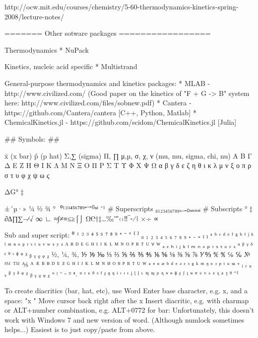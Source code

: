 http://ocw.mit.edu/courses/chemistry/5-60-thermodynamics-kinetics-spring-2008/lecture-notes/




======= Other sotware packages =================


Thermodynamics
* NuPack


Kinetics, nucleic acid specific
* Multistrand

General-purpose thermodynamics and kinetics packages:
* MLAB - http://www.civilized.com/ (Good paper on the kinetics of "F + G -> B" system here: http://www.civilized.com/files/sobnew.pdf)
* Cantera - https://github.com/Cantera/cantera   [C++, Python, Matlab]
* ChemicalKinetics.jl - https://github.com/scidom/ChemicalKinetics.jl  [Julia]



## Symbols: ##

    x̄  (x bar)
    p̂  (p hat)
    Σ,∑  (sigma)
    Π, ∏
    μ,µ, σ, χ, ν (mu, mu, sigma, chi, nu)
    Α Β Γ Δ Ε Ζ Η Θ Ι Κ Λ Μ Ν Ξ Ο Π Ρ Σ Τ Υ Φ Χ Ψ Ω
    α β γ δ ε ζ η θ ι κ λ μ ν ξ ο π ρ σ τ υ φ χ ψ ω ς

    ΔG°
    ‡

    ±´µ·» ¼ ½ ¾ ° ­
    ⁰¹²³⁴⁵⁶⁷⁸⁹⁺⁻⁼⁽⁾ⁿⁱ  ⁻¹       # Superscripts
    ₀₁₂₃₄₅₆₇₈₉₊₋₌₍₎ₐₑₒₓₔᵢ       # Subscripts
    ° ‡
    ∂∆∏∑−∕∙√ ∞ ∟ ≈∫≠≡≤≥⌠⌡
    Ω℮†‡…‰′″‹›‼‾⁃⁄⁞
    ×÷ ∝

    Sub and super script:
     ⁰ ¹ ² ³ ⁴ ⁵ ⁶ ⁷ ⁸ ⁹ ⁺ ⁻ ⁼ ⁽ ⁾ ₀ ₁ ₂ ₃ ₄ ₅ ₆ ₇ ₈ ₉ ₊ ₋ ₌ ₍ ₎
     ᵃ ᵇ ᶜ ᵈ ᵉ ᶠ ᵍ ʰ ⁱ ʲ ᵏ ˡ ᵐ ⁿ ᵒ ᵖ ʳ ˢ ᵗ ᵘ ᵛ ʷ ˣ ʸ ᶻ
     ᴬ ᴮ ᴰ ᴱ ᴳ ᴴ ᴵ ᴶ ᴷ ᴸ ᴹ ᴺ ᴼ ᴾ ᴿ ᵀ ᵁ ⱽ ᵂ
     ₐ ₑ ₕ ᵢ ⱼ ₖ ₗ ₘ ₙ ₒ ₚ ᵣ ₛ ₜ ᵤ ᵥ ₓ
     ᵅ ᵝ ᵞ ᵟ ᵋ ᶿ ᶥ ᶲ ᵠ ᵡ ᵦ ᵧ ᵨ ᵩ ᵪ
     ½, ¼, ¾, ⅐ ⅑ ⅒ ⅓ ⅔ ⅕ ⅖ ⅗ ⅘ ⅙ ⅚ ⅛ ⅜ ⅝ ⅞ ⅟ ↉
     ℀ ℁ ℅ ℆ № ℠ ™ ⅍
     ᴬ ᴭ ᴮ ᴯ ᴰ ᴱ ᴲ ᴳ ᴴ ᴵ ᴶ ᴷ ᴸ ᴹ ᴺ ᴻ ᴼ ᴽ ᴾ ᴿ ᵀ ᵁ ᵂ ᵃ ᵄ ᵅ ᵆ ᵇ ᵈ ᵉ ᵊ ᵋ ᵌ ᵍ ᵏ ᵐ ᵑ ᵒ ᵓ ᵖ ᵗ ᵘ ᵚ ᵛ ᵢ ᵣ ᵤ ᵥ
     ᵝ ᵞ ᵟ ᵠ ᵡ ᵦ ᵧ ᵨ ᵩ ᵪ ᵸ ᵎ ᵔ ᵕ ᵙ ᵜ.
     ᶛ ᶜ ᶝ ᶞ ᶟ ᶠ ᶡ ᶢ ᶣ ᶤ ᶥ ᶦ ᶧ ᶨ ᶩ ᶪ ᶫ ᶬ ᶭ ᶮ ᶯ ᶰ ᶱ ᶲ ᶳ ᶴ ᶵ ᶶ ᶷ ᶸ ᶹ ᶺ ᶻ ᶼ ᶽ ᶾ ᶿ
    ⁻¹



To create diacritics (bar, hat, etc), use Word
    Enter base character, e.g. x, and a space: "x "
    Move cursor back right after the x
    Insert diacritic, e.g. with charmap or ALT+number combination, e.g. ALT+0772 for bar:
    Unfortunately, this doesn't work with Windows 7 and new version of word.
    (Although numlock sometimes helps...)
    Easiest is to just copy/paste from above.
